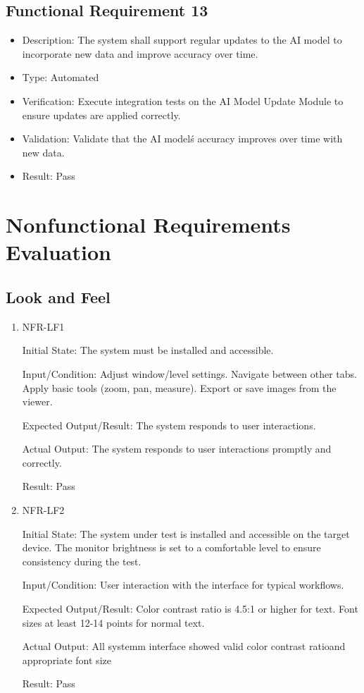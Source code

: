 \documentclass[12pt, titlepage]{article}
\begin{document}
\subsection{Functional Requirement 13}
\begin{itemize}  
  \item Description: The system shall support regular updates to the AI model to incorporate new data and improve accuracy over time.
  \item Type: Automated
  \item Verification: Execute integration tests on the AI Model Update Module to ensure updates are applied correctly.
  \item Validation: Validate that the AI model\'s accuracy improves over time with new data.
  \item Result: Pass
\end{itemize}

\section{Nonfunctional Requirements Evaluation}

\subsection{Look and Feel}
\begin{enumerate}

\item{NFR-LF1\\}\label{NFR-LF1}

Initial State: The system must be installed and accessible.

Input/Condition: Adjust window/level settings. Navigate between other tabs. Apply basic tools (zoom, pan, measure). Export or save images from the viewer.

Expected Output/Result: The system responds to user interactions.

Actual Output: The system responds to user interactions promptly and correctly.

Result: Pass

\item{NFR-LF2\\}\label{NFR-LF2}

Initial State: The system under test is installed and accessible on the target device. The monitor brightness is set to a comfortable level to ensure consistency during the test.

Input/Condition: User interaction with the interface for typical workflows.

Expected Output/Result: Color contrast ratio is 4.5:1 or higher for text. Font sizes at least 12-14 points for normal text.

Actual Output: All systemm interface showed valid color contrast ratioand appropriate font size 

Result: Pass

\end{enumerate}
\end{document}
